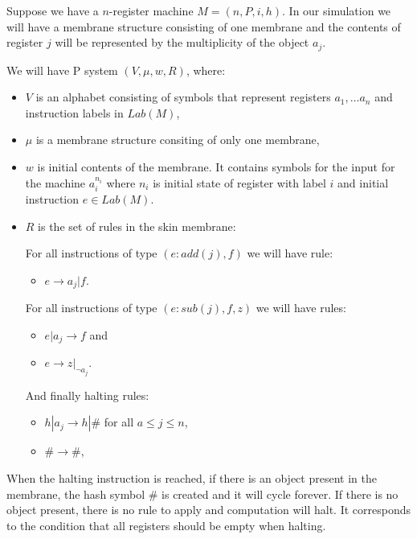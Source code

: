 \documentclass[a4paper,10pt]{article}
\begin{document}
\begin{dokaz}
  Suppose we have a $n$-register machine $M = (n,P,i,h)$. In our simulation we will have a membrane structure consisting of one membrane and the contents of register $j$ will be represented by the multiplicity of the object $a_j$.

  We will have P system $(V, \mu, w, R)$, where:
  \begin{itemize}
    \item $V$ is an alphabet consisting of symbols that represent registers $a_1,\dots a_n$ and instruction labels in $Lab(M)$,
    \item $\mu$ is a membrane structure consiting of only one membrane,
    \item $w$ is initial contents of the membrane. It contains symbols for the input for the machine $a_i^{n_i}$ where $n_i$ is initial state of register with label $i$ and initial instruction $e \in Lab(M)$.
    \item $R$ is the set of rules in the skin membrane:
    
    For all instructions of type $(e : add(j), f)$ we will have rule:
    \begin{itemize}
      \item $e \rightarrow a_j|f$.
    \end{itemize}
    
    For all instructions of type $(e : sub(j), f, z)$ we will have rules:
    \begin{itemize}
      \item $e|a_j \rightarrow f$ and
      \item $e \rightarrow z|_{\neg a_j}$.
    \end{itemize}

    And finally halting rules:
    \begin{itemize}
      \item $h|a_j \rightarrow h|\#$ for all $a\leq j\leq n$,
      \item $\# \rightarrow \#$,
    \end{itemize}
  \end{itemize}

  When the halting instruction is reached, if there is an object present in the membrane, the hash symbol $\#$ is created and it will cycle forever. If there is no object present, there is no rule to apply and computation will halt. It corresponds to the condition that all registers should be empty when halting.
\end{dokaz}
\end{document}
